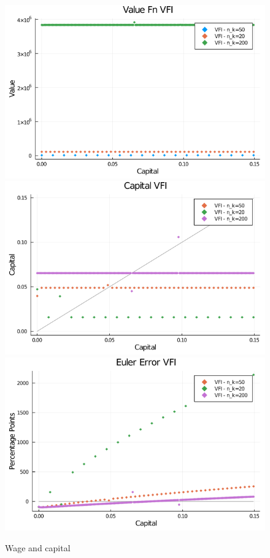 \documentclass[]{article}
\begin{document}
\begin{figure}

{\centering \includegraphics[width=0.7\linewidth]{Assignment2/graphs/VFI_V} \includegraphics[width=0.7\linewidth]{Assignment2/graphs/VFI_cap} \includegraphics[width=0.7\linewidth]{Assignment2/graphs/VFI_Euler} 

}

\caption{Wage and capital}\label{fig:unnamed-chunk-2}
\end{figure}
\end{document}
